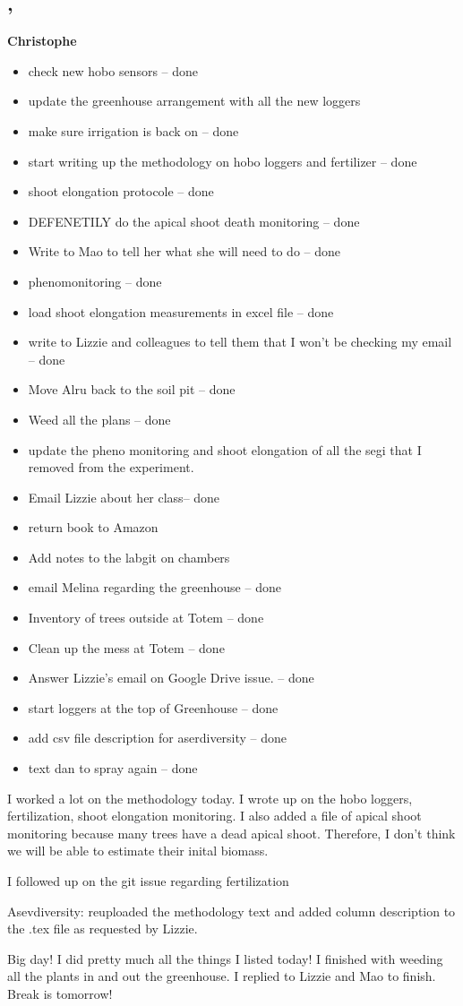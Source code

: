 \subsection*{\weekday, \day}
\textbf {Christophe}
\begin{itemize}
	\item check new hobo sensors -- done
	\item update the greenhouse arrangement with all the new loggers
	\item make sure irrigation is back on -- done
	\item start writing up the methodology on hobo loggers and fertilizer -- done
	\item shoot elongation protocole -- done
	\item DEFENETILY do the apical shoot death monitoring -- done
	\item Write to Mao to tell her what she will need to do -- done
	\item phenomonitoring -- done
	\item load shoot elongation measurements in excel file -- done
	\item write to Lizzie and colleagues to tell them that I won't be checking my email -- done
	\item Move Alru back to the soil pit -- done
	\item Weed all the plans -- done
	\item update the pheno monitoring and shoot elongation of all the segi that I removed from the experiment. 
	\item Email Lizzie about her class-- done
	\item return book to Amazon
	\item Add notes to the labgit on chambers
	\item email Melina regarding the greenhouse -- done
	\item Inventory of trees outside at Totem -- done
	\item Clean up the mess at Totem -- done
	\item Answer Lizzie's email on Google Drive issue. -- done
	\item start loggers at the top of Greenhouse -- done
	\item add csv file description for aserdiversity -- done
	\item text dan to spray again -- done
\end{itemize}
I worked a lot on the methodology today. I wrote up on the hobo loggers, fertilization, shoot elongation monitoring. I also added a file of apical shoot monitoring because many trees have a dead apical shoot. Therefore, I don't think we will be able to estimate their inital biomass. 
\par I followed up on the git issue regarding fertilization
\par Asevdiversity: reuploaded the methodology text and added column description to the .tex file as requested by Lizzie. 
\par Big day! I did pretty much all the things I listed today! I finished with weeding all the plants in and out the greenhouse. I replied to Lizzie and Mao to finish. Break is tomorrow!

